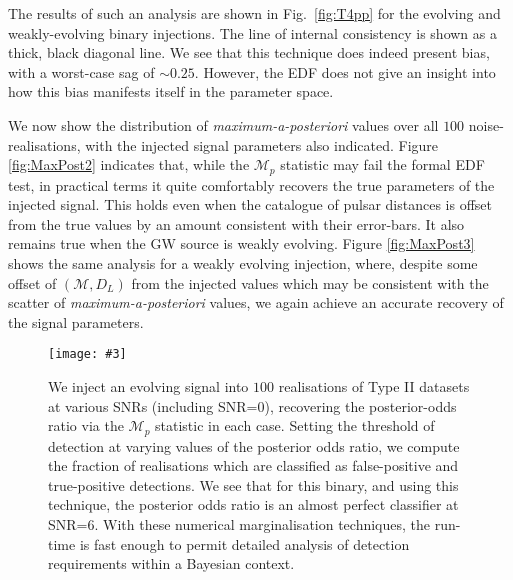 \documentclass[twocolappendix,tighten]{emulateapj}
\newcommand{\incgraph}[3]{\texttt{[image: \#3]}}
\begin{document}
The results of such an analysis are shown in Fig.\ \ref{fig:T4pp} for the evolving and weakly-evolving binary injections. The line of internal consistency is shown as a thick, black diagonal line. We see that this technique does indeed present bias, with a worst-case sag of $\sim 0.25$. However, the EDF does not give an insight into how this bias manifests itself in the parameter space. 

We now show the distribution of {\it maximum-a-posteriori} values over all $100$ noise-realisations, with the injected signal parameters also indicated. Figure \ref{fig:MaxPost2} indicates that, while the {\bf $\mathcal{M}_p$} statistic may fail the formal EDF test, in practical terms it quite comfortably recovers the true parameters of the injected signal. This holds even when the catalogue of pulsar distances is offset from the true values by an amount consistent with their error-bars. %
It also remains true when the GW source is weakly evolving. Figure \ref{fig:MaxPost3} shows the same analysis for a weakly evolving injection, where, despite some offset of $(\mathcal{M},D_L)$ from the injected values which may be consistent with the scatter of {\it maximum-a-posteriori} values, we again achieve an accurate recovery of the signal parameters.

\begin{figure}
  \centering
  \incgraph{0}{0.5}{ROCcurves_M7e8_Fgw2m8.pdf}
   \caption{\label{fig:ROC}We inject an evolving signal into $100$ realisations of Type II datasets at various SNRs (including SNR=0), recovering the posterior-odds ratio via the {\bf $\mathcal{M}_p$} statistic in each case. Setting the threshold of detection at varying values of the posterior odds ratio, we compute the fraction of realisations which are classified as false-positive and true-positive detections. We see that for this binary, and using this technique, the posterior odds ratio is an almost perfect classifier at SNR=6. With these numerical marginalisation techniques, the run-time is fast enough to permit detailed analysis of detection requirements within a Bayesian context.} 
 \end{figure}
\end{document}
